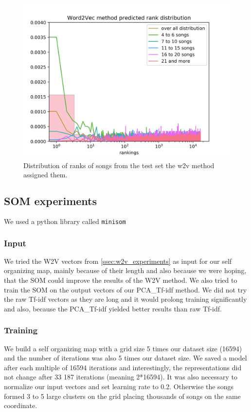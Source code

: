 \begin{figure}[h]
    \centering
	\includegraphics[width=120mm]{./img/w2v_graph.png}
	\caption{Distribution of ranks of songs from the test set the w2v method assigned them.}
	\label{fig:w2v_distribution}
\end{figure}

\subsection{SOM experiments}
We used a python library called \texttt{minisom} \cite{Vettigli2019}
\subsubsection{Input}
We tried the W2V vectors from \ref{ssec:w2v_experiments} as input for our self organizing map, mainly because of their length and also because we were hoping, that the SOM could improve the results of the W2V method. We also tried to train the SOM on the output vectors of our PCA\_Tf-idf method. We did not try the raw Tf-idf vectors as they are long and it would prolong training significantly and also, because the PCA\_Tf-idf yielded better results than raw Tf-idf.

\subsubsection{Training}
We build a self organizing map with a grid size 5 times our dataset size (16594) and the number of iterations was also 5 times our dataset size. We saved a model after each multiple of 16594 iterations and interestingly, the representations did not change after 33 187 iterations (meaning 2*16594). It was also necessary to normalize our input vectors and set learning rate to 0.2. Otherwise the songs formed 3 to 5 large clusters on the grid placing thousands of songs on the same coordinate. 
